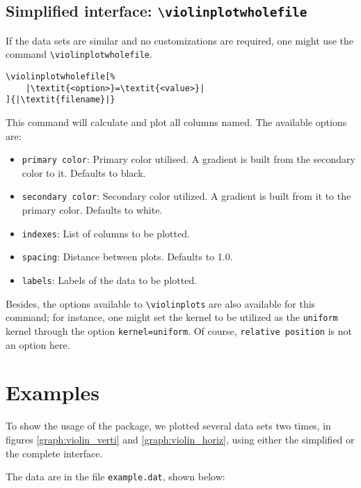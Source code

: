 \documentclass{article}
\begin{document}
\subsection{Simplified interface: \texttt{{\textbackslash}violinplotwholefile}}

If the data sets are similar and no customizations are required, one might
use the command \texttt{{\textbackslash}violinplotwholefile}.

\begin{verbatim}
\violinplotwholefile[%
	|\textit{<option>}=\textit{<value>}|
]{|\textit{filename}|}
\end{verbatim}

This command will calculate and plot all columns named. The available options
are:

\begin{itemize}
	\item \texttt{primary color}: Primary color utilised. A gradient is built from
		the secondary color to it. Defaults to black.
	\item \texttt{secondary color}: Secondary color utilized. A
		gradient is built from it to the primary color. Defaults
		to white.
	\item \texttt{indexes}: List of columns to be plotted.
	\item \texttt{spacing}: Distance between plots. Defaults to 1.0.
	\item \texttt{labels}: Labels of the data to be plotted.
\end{itemize}

Besides, the options available to \texttt{{\textbackslash}violinplots} are also
available for this command; for instance, one might set the kernel to
be utilized as the \texttt{uniform} kernel through the option
\texttt{kernel=uniform}. Of course, \texttt{relative position} is not an option
here.

\section{Examples}

To show the usage of the package, we plotted several data sets two times, in
figures \ref{graph:violin_verti} and \ref{graph:violin_horiz}, using either the
simplified or the complete interface.

The data are in the file \texttt{example.dat}, shown below:

\end{document}
